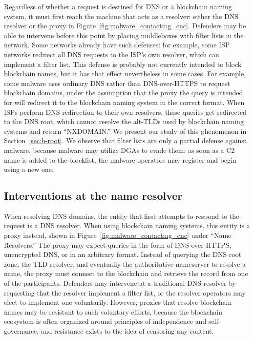 Regardless of whether a request is destined for DNS or a 
blockchain naming 
system, it must first reach the machine that acts as a 
resolver: either the DNS 
resolver or the proxy in 
Figure~\ref{fig:malware_contacting_cnc}. Defenders may 
be able to intervene before this point by placing middleboxes 
with filter lists 
in the network. Some networks already have such defenses: for 
example, some ISP 
networks redirect all DNS requests to the ISP's own resolver, 
which can 
implement a filter list. This defense is probably not 
currently intended to 
block blockchain names, but it has that effect nevertheless 
in some cases. For example, some malware uses 
ordinary DNS rather than DNS-over-HTTPS to request blockchain 
domains, under 
the assumption that the proxy the query is intended for will 
redirect it to the 
blockchain naming system in the correct format. When ISPs 
perform DNS 
redirection to their own resolvers, these queries get 
redirected to the DNS 
root, which cannot resolve the alt-TLDs used by blockchain 
naming systems and return ``NXDOMAIN.'' We 
present our study of this phenomenon in 
Section~\ref{sec:b-root}. We observe 
that filter lists are only a partial defense against malware, 
because malware may utilize DGAs to evade them: as soon as a 
C2 name is added to the blocklist, the malware operators may 
register and begin using a new one. 

\subsection{Interventions at the name resolver}

When resolving DNS domains, the entity that first attempts to 
respond to the request is a DNS resolver. When using 
blockchain naming systems, this entity is a proxy instead, 
shown in Figure~\ref{fig:malware_contacting_cnc} under ``Name 
Resolvers.'' The proxy
may expect queries in 
the form of DNS-over-HTTPS, unencrypted DNS, or in an 
arbitrary format. Instead of querying the DNS root zone, the 
TLD resolver, and eventually the authoritative nameserver to 
resolve a name, the proxy must connect to the blockchain and 
retrieve the record from one of the participants.
Defenders may intervene at a traditional DNS resolver by requesting that the 
resolver implement a filter list, or the resolver operators may elect to 
implement one voluntarily. However, proxies that resolve blockchain names may 
be resistant to such voluntary efforts, because the blockchain ecosystem is 
often organized around principles of independence and self-governance, and 
resistance exists to the idea of censoring any content.

